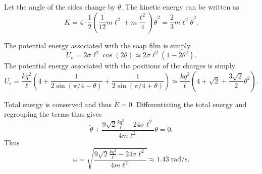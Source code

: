 \begin{solution}
Let the angle of the sides change by $\theta$. The kinetic energy can be written as
\[K=4\cdot\frac{1}{2}\left(\frac{1}{12}m\ell^2+m\frac{\ell^2}{4}\right)\dot\theta^2=\frac 23 m\ell^2\dot\theta^2.\]

The potential energy associated with the soap film is simply
\[U_\sigma=2\sigma\ell^2\cos(2\theta)\simeq 2\sigma\ell^2\left(1-2\theta^2\right).\]
The potential energy associated with the positions of the charges is simply
\[U_\varepsilon=\frac{kq^2}{\ell}\left(4+\frac{1}{2\sin\left(\pi/4-\theta\right)}+\frac{1}{2\sin(\pi/4+\theta)}\right)\simeq \frac{kq^2}{\ell}\left(4+\sqrt{2}+\frac{3\sqrt{2}}{2}\theta^2\right).\]

Total energy is conserved and thus $\dot E=0.$ Differentiating the total energy and regrouping the terms thus gives
\[\ddot\theta+\frac{9\sqrt{2}\frac{kq^2}{\ell}-24\sigma\ell^2}{4 m\ell^2}\theta=0.\]
Thus
\[\omega=\sqrt{\frac{9\sqrt{2}\frac{kq^2}{\ell}-24\sigma\ell^2}{4 m\ell^2}}\approx \boxed{1.43\;\mathrm{rad/s}.}\]
\end{solution}